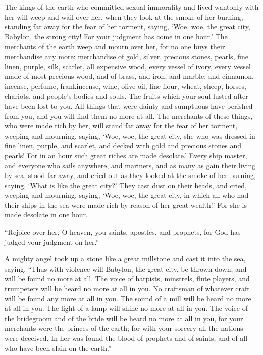  The kings of the earth who committed sexual immorality and
lived wantonly with her will weep and wail over her, when they look at
the smoke of her burning,  standing far away for the fear
of her torment, saying, `Woe, woe, the great city, Babylon, the strong
city! For your judgment has come in one hour.'  The
merchants of the earth weep and mourn over her, for no one buys their
merchandise any more:  merchandise of gold, silver,
precious stones, pearls, fine linen, purple, silk, scarlet, all
expensive wood, every vessel of ivory, every vessel made of most
precious wood, and of brass, and iron, and marble;  and
cinnamon, incense, perfume, frankincense, wine, olive oil, fine flour,
wheat, sheep, horses, chariots, and people's bodies and souls.
 The fruits which your soul lusted after have been lost to
you. All things that were dainty and sumptuous have perished from you,
and you will find them no more at all.  The merchants of
these things, who were made rich by her, will stand far away for the
fear of her torment, weeping and mourning,  saying, `Woe,
woe, the great city, she who was dressed in fine linen, purple, and
scarlet, and decked with gold and precious stones and pearls!
 For in an hour such great riches are made desolate.' Every
ship master, and everyone who sails anywhere, and mariners, and as many
as gain their living by sea, stood far away,  and cried out
as they looked at the smoke of her burning, saying, `What is like the
great city?'  They cast dust on their heads, and cried,
weeping and mourning, saying, `Woe, woe, the great city, in which all
who had their ships in the sea were made rich by reason of her great
wealth!' For she is made desolate in one hour.

 ``Rejoice over her, O heaven, you saints, apostles, and
prophets, for God has judged your judgment on her.''

 A mighty angel took up a stone like a great millstone and
cast it into the sea, saying, ``Thus with violence will Babylon, the
great city, be thrown down, and will be found no more at all.
 The voice of harpists, minstrels, flute players, and
trumpeters will be heard no more at all in you. No craftsman of whatever
craft will be found any more at all in you. The sound of a mill will be
heard no more at all in you.  The light of a lamp will
shine no more at all in you. The voice of the bridegroom and of the
bride will be heard no more at all in you, for your merchants were the
princes of the earth; for with your sorcery all the nations were
deceived.  In her was found the blood of prophets and of
saints, and of all who have been slain on the earth.''


